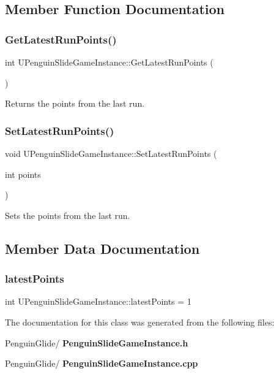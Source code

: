 \subsection{Member Function Documentation}
\mbox{\label{class_u_penguin_slide_game_instance_ac29e6f5c900b621d3daebb24b8677a7a}} 
\subsubsection{GetLatestRunPoints()}
{\footnotesize\ttfamily int U\+Penguin\+Slide\+Game\+Instance\+::\+Get\+Latest\+Run\+Points (\begin{DoxyParamCaption}{ }\end{DoxyParamCaption})}



Returns the points from the last run. 

\mbox{\label{class_u_penguin_slide_game_instance_a8c188d460c49a1f392a97b5c3d08ce1e}} 
\subsubsection{SetLatestRunPoints()}
{\footnotesize\ttfamily void U\+Penguin\+Slide\+Game\+Instance\+::\+Set\+Latest\+Run\+Points (\begin{DoxyParamCaption}\item[{int}]{points }\end{DoxyParamCaption})}



Sets the points from the last run. 



\subsection{Member Data Documentation}
\mbox{\label{class_u_penguin_slide_game_instance_a5be08cbee621c104f416f9293947fe1f}} 
\subsubsection{latestPoints}
{\footnotesize\ttfamily int U\+Penguin\+Slide\+Game\+Instance\+::latest\+Points = 1\hspace{0.3cm}{\ttfamily [private]}}



The documentation for this class was generated from the following files\+:\begin{DoxyCompactItemize}
\item 
Penguin\+Glide/\textbf{ Penguin\+Slide\+Game\+Instance.\+h}\item 
Penguin\+Glide/\textbf{ Penguin\+Slide\+Game\+Instance.\+cpp}\end{DoxyCompactItemize}
